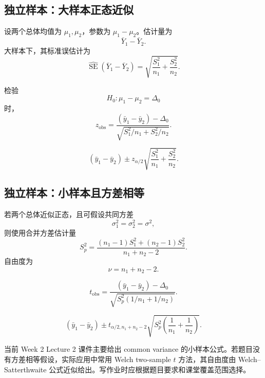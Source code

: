 \documentclass[11pt,a4paper]{article}
\theoremstyle{definition}
\theoremstyle{plain}
\theoremstyle{remark}
\newcommand{\se}{\operatorname{SE}}
\begin{document}
\subsection{独立样本：大样本正态近似}

设两个总体均值为 $\mu_1,\mu_2$，参数为 $\mu_1-\mu_2$。估计量为
\[
    \bar Y_1-\bar Y_2.
\]
大样本下，其标准误估计为
\[
    \widehat{\se}(\bar Y_1-\bar Y_2)
    =
    \sqrt{\frac{S_1^2}{n_1}+\frac{S_2^2}{n_2}}.
\]

\begin{memorybox}
检验
\[
    H_0:\mu_1-\mu_2=\Delta_0
\]
时，
\[
    \boxed{
    z_{\text{obs}}
    =
    \frac{(\bar y_1-\bar y_2)-\Delta_0}
    {\sqrt{S_1^2/n_1+S_2^2/n_2}}.
    }
\]
\end{memorybox}

\begin{memorybox}
\[
    \boxed{
    (\bar y_1-\bar y_2)
    \pm
    z_{\alpha/2}
    \sqrt{\frac{S_1^2}{n_1}+\frac{S_2^2}{n_2}}.
    }
\]
\end{memorybox}

\subsection{独立样本：小样本且方差相等}

若两个总体近似正态，且可假设共同方差
\[
    \sigma_1^2=\sigma_2^2=\sigma^2,
\]
则使用合并方差估计量
\[
    S_p^2
    =
    \frac{(n_1-1)S_1^2+(n_2-1)S_2^2}{n_1+n_2-2}.
\]
自由度为
\[
    \nu=n_1+n_2-2.
\]

\begin{memorybox}
\[
    \boxed{
    t_{\text{obs}}
    =
    \frac{(\bar y_1-\bar y_2)-\Delta_0}
    {\sqrt{S_p^2(1/n_1+1/n_2)}}.
    }
\]
\end{memorybox}

\begin{memorybox}
\[
    \boxed{
    (\bar y_1-\bar y_2)
    \pm
    t_{\alpha/2,n_1+n_2-2}
    \sqrt{S_p^2\left(\frac{1}{n_1}+\frac{1}{n_2}\right)}.
    }
\]
\end{memorybox}

\begin{warnbox}[方差相等假设]
当前 Week 2 Lecture 2 课件主要给出 common variance 的小样本公式。若题目没有方差相等假设，实际应用中常用 Welch two-sample $t$ 方法，其自由度由 Welch--Satterthwaite 公式近似给出。写作业时应根据题目要求和课堂覆盖范围选择。
\end{warnbox}
\end{document}
